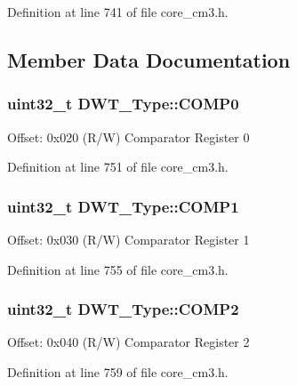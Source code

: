 Definition at line 741 of file core\+\_\+cm3.\+h.



\subsection{Member Data Documentation}
\subsubsection[{\texorpdfstring{C\+O\+M\+P0}{COMP0}}]{ uint32\+\_\+t D\+W\+T\+\_\+\+Type\+::\+C\+O\+M\+P0}\hypertarget{structDWT__Type_a7cf71ff4b30a8362690fddd520763904}{}\label{structDWT__Type_a7cf71ff4b30a8362690fddd520763904}
Offset\+: 0x020 (R/W) Comparator Register 0 

Definition at line 751 of file core\+\_\+cm3.\+h.

\subsubsection[{\texorpdfstring{C\+O\+M\+P1}{COMP1}}]{ uint32\+\_\+t D\+W\+T\+\_\+\+Type\+::\+C\+O\+M\+P1}\hypertarget{structDWT__Type_a4a5bb70a5ce3752bd628d5ce5658cb0c}{}\label{structDWT__Type_a4a5bb70a5ce3752bd628d5ce5658cb0c}
Offset\+: 0x030 (R/W) Comparator Register 1 

Definition at line 755 of file core\+\_\+cm3.\+h.

\subsubsection[{\texorpdfstring{C\+O\+M\+P2}{COMP2}}]{ uint32\+\_\+t D\+W\+T\+\_\+\+Type\+::\+C\+O\+M\+P2}\hypertarget{structDWT__Type_a8927aedbe9fd6bdae8983088efc83332}{}\label{structDWT__Type_a8927aedbe9fd6bdae8983088efc83332}
Offset\+: 0x040 (R/W) Comparator Register 2 

Definition at line 759 of file core\+\_\+cm3.\+h.

